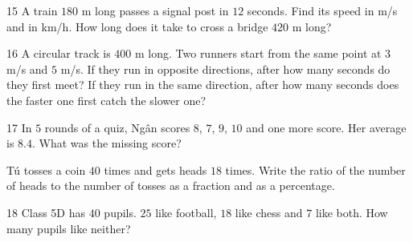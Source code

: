 \gap
\begin{probbox}{15}{}
A train $180$ m long passes a signal post in $12$ seconds.  Find its speed in m/s and in km/h.  How long does it take to cross a bridge $420$ m long?
\end{probbox}
\gap
\begin{probbox}{16}{}
A circular track is $400$ m long. Two runners start from the same point at $3$ m/s and $5$ m/s.  If they run in opposite directions, after how many seconds do they first meet?  If they run in the same direction, after how many seconds does the faster one first catch the slower one?
\end{probbox}
\gap
\begin{probbox}{17}{\relax}
 In $5$ rounds of a quiz, Ngân scores $8$, $7$, $9$, $10$ and one more score. Her average is $8.4$. What was the missing score?\par
{} Tú tosses a coin $40$ times and gets heads $18$ times. Write the ratio of the number of heads to the number of tosses as a fraction and as a percentage.
\end{probbox}
\gap
\begin{probbox}{18}{\relax}
Class 5D has $40$ pupils. $25$ like football, $18$ like chess and $7$ like both. How many pupils like neither?
\end{probbox}
